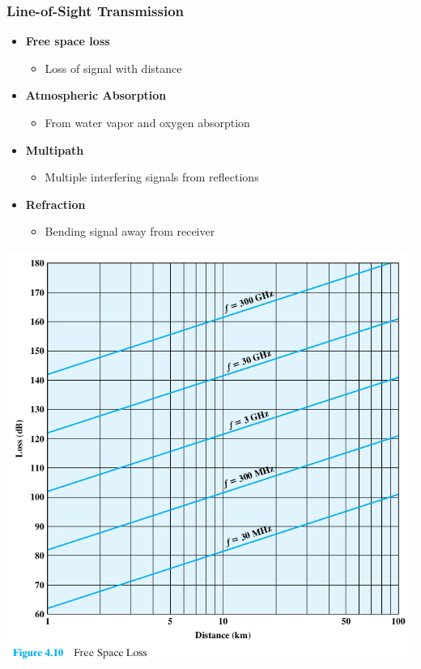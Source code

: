 \documentclass[pdflatex,compress]{beamer}
\begin{document}
\begin{frame}
	\frametitle{Line-of-Sight Transmission}
	\begin{itemize}
		\item \textbf{Free space loss}
		\begin{itemize}
			\item Loss of signal with distance
		\end{itemize}
		\item \textbf{Atmospheric Absorption}
		\begin{itemize}
			\item From water vapor and oxygen absorption
		\end{itemize}
		\item \textbf{Multipath}
		\begin{itemize}
			\item Multiple interfering signals from reflections
		\end{itemize}
		\item \textbf{Refraction}
		\begin{itemize}
			\item Bending signal away from receiver
		\end{itemize}
	\end{itemize}
\end{frame}

\begin{frame}
	\begin{center}
		\includegraphics[width=0.7\linewidth]{img/img27}
	\end{center}
\end{frame}
\end{document}
